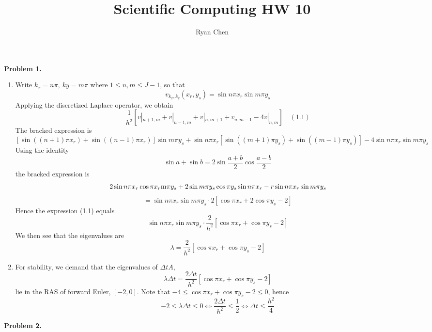 \documentclass{article}
\title{Scientific Computing HW 10}
\author{Ryan Chen}
\def\tbf#1{\textbf{#1}}
\newcommand{\sbr}[1]{\left[#1\right]}
\begin{document}
	
\maketitle



\tbf{Problem 1.}

\begin{enumerate}[label=(\alph*)]
	
\item Write $k_x=n\pi,~ky=m\pi$ where $1\le n,m\le J-1$, so that
$$v_{k_x,k_y}(x_r,y_s) = \sin n\pi x_r\sin m\pi y_s$$
Applying the discretized Laplace operator, we obtain
$$\frac{1}{h^2}\sbr{v|_{n+1,m}+v|_{n-1,m}+v|_{n,m+1}+v_{n,m-1}-4v|_{n,m}} \quad (1.1)$$
The bracked expression is
$$\sbr{\sin((n+1)\pi x_r)+\sin((n-1)\pi x_r)}\sin m\pi y_s + \sin n\pi x_r\sbr{\sin((m+1)\pi y_s)+\sin((m-1)\pi y_s)} - 4\sin n\pi x_r\sin m\pi y_s$$
Using the identity
$$\sin a + \sin b = 2\sin\frac{a+b}{2}\cos\frac{a-b}{2}$$
the bracked expression is
$$2\sin n\pi x_r\cos\pi x_r\si m\pi y_s + 2\sin m\pi y_s\cos\pi y_s\sin n\pi x_r - r\sin n\pi x_r\sin m\pi y_s$$
$$= \sin n\pi x_r\sin m\pi y_s\cdot 2\sbr{\cos\pi x_r+2\cos\pi y_s-2}$$
Hence the expression (1.1) equals
$$\sin n\pi x_r\sin m\pi y_s\cdot \frac{2}{h^2}\sbr{\cos\pi x_r+\cos\pi y_s-2}$$
We then see that the eigenvalues are
$$\lambda = \frac{2}{h^2}\sbr{\cos\pi x_r+\cos\pi y_s-2}$$


\item For stability, we demand that the eigenvalues of $\Delta tA$,
$$\lambda\Delta t = \frac{2\Delta t}{h^2}[\cos\pi x_r+\cos\pi y_s-2]$$
lie in the RAS of forward Euler, $[-2,0]$. Note that $-4\le\cos\pi x_r+\cos\pi y_s-2\le0$, hence
$$-2 \le \lambda\Delta t \le 0
\iff \frac{2\Delta t}{h^2} \le \frac12
\iff \Delta t \le \frac{h^2}{4}$$ 

\end{enumerate}
\pagebreak



\tbf{Problem 2.}
\end{document}
